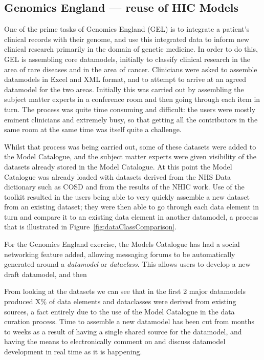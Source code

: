 \subsection{Genomics England --- reuse of HIC Models}

One of the prime tasks of Genomics England (GEL) is to integrate a patient's clinical records with their genome, and use this integrated data to inform new clinical research primarily in the domain of genetic medicine. In order to do this, GEL is assembling core datamodels, initially to classify clinical research in the area of rare diseases and in the area of cancer.  Clinicians were asked to assemble datamodels in Excel and XML format, and to attempt to arrive at an agreed datamodel for the two areas.  Initially this was carried out by assembling the subject matter experts in a conference room and then going through each item in turn. The process was quite time consuming and difficult: the users were mostly eminent clinicians and extremely busy, so that getting all the contributors in the same room at the same time was itself quite a challenge.

Whilst that process was being carried out, some of these datasets were added to the Model Catalogue, and the subject matter experts were given visibility of the datasets already stored in the Model Catalogue. At this point the Model Catalogue was already loaded with datasets derived from the NHS Data dictionary such as COSD and from the results of the NHIC work. Use of the toolkit resulted in the users being able to very quickly assemble a new dataset from an existing dataset; they were then able to go through each data element in turn and compare it to an existing data element in another datamodel, a process that is illustrated in Figure~\ref{fig:dataClassComparison}.

For the Genomics England exercise, the Models Catalogue has had a social networking feature added, allowing messaging forums to be automatically generated around a \emph{datamodel} or \emph{dataclass}. This allows users to develop a new draft datamodel, and then 

From looking at the datasets we can see that in the first 2 major datamodels produced X\% of data elements and dataclasses were derived from existing sources, a fact entirely due to the use of the Model Catalogue in the data curation process. Time to assemble a new datamodel has been cut from months to weeks as a result of having a single shared source for the datamodel, and having the means to electronically comment on and discuss datamodel development in real time as it is happening.



